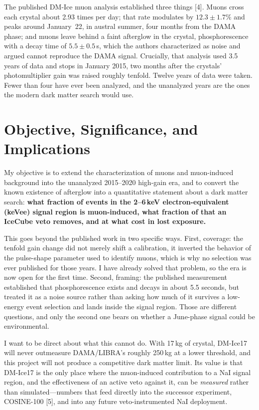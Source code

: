 \documentclass[12pt,letterpaper]{article}
\begin{document}
The published DM-Ice muon analysis established three things [4]. Muons cross each
crystal about 2.93 times per day; that rate modulates by $12.3 \pm 1.7\%$ and peaks
around January~22, in austral summer, four months from the DAMA phase; and muons
leave behind a faint afterglow in the crystal, phosphorescence with a decay time of
$5.5 \pm 0.5$\,s, which the authors characterized as noise and argued cannot reproduce
the DAMA signal. Crucially, that analysis used 3.5 years of data and stops in January
2015, two months after the crystals' photomultiplier gain was raised roughly tenfold.
Twelve years of data were taken. Fewer than four have ever been analyzed, and the
unanalyzed years are the ones the modern dark matter search would use.

\section{Objective, Significance, and Implications}

My objective is to extend the characterization of muons and muon-induced background
into the unanalyzed 2015--2020 high-gain era, and to convert the known existence of
afterglow into a quantitative statement about a dark matter search: \textbf{what
fraction of events in the 2--6\,keV electron-equivalent (keVee) signal region is
muon-induced, what fraction of that an IceCube veto removes, and at what cost in
lost exposure.}

This goes beyond the published work in two specific ways. First, coverage: the
tenfold gain change did not merely shift a calibration, it inverted the behavior of
the pulse-shape parameter used to identify muons, which is why no selection was ever
published for those years. I have already solved that problem, so the era is now
open for the first time. Second, framing: the published measurement established that
phosphorescence exists and decays in about 5.5 seconds, but treated it as a noise
source rather than asking how much of it survives a low-energy event selection and
lands inside the signal region. Those are different questions, and only the second
one bears on whether a June-phase signal could be environmental.

I want to be direct about what this cannot do. With 17\,kg of crystal, DM-Ice17 will
never outmeasure DAMA/LIBRA's roughly 250\,kg at a lower threshold, and this project
will not produce a competitive dark matter limit. Its value is that DM-Ice17 is the
only place where the muon-induced contribution to a NaI signal region, and the
effectiveness of an active veto against it, can be \emph{measured} rather than
simulated---numbers that feed directly into the successor experiment, COSINE-100 [5],
and into any future veto-instrumented NaI deployment.
\end{document}
